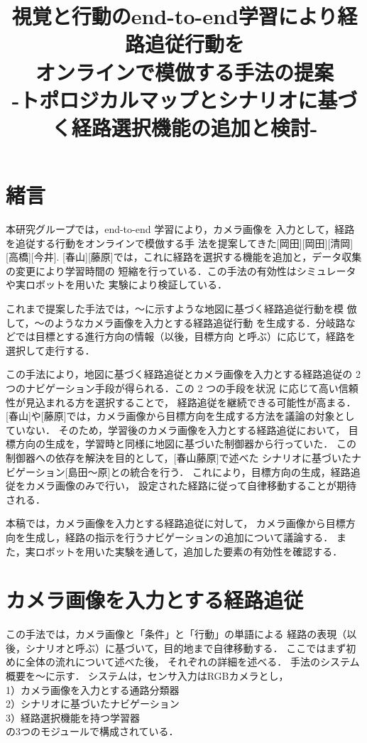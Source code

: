 \documentclass{sice-si}
\title{視覚と行動のend-to-end学習により経路追従行動を\\
オンラインで模倣する手法の提案\\
-トポロジカルマップとシナリオに基づく経路選択機能の追加と検討-\\} %
\begin{document}

\maketitle

\section{緒言}

本研究グループでは，end-to-end 学習により，カメラ画像を
入力として，経路を追従する行動をオンラインで模倣する手
法を提案してきた[岡田][岡田][清岡][高橋][今井].
[春山][藤原]では，これに経路を選択する機能を追加と，データ収集の変更により学習時間の
短縮を行っている．この手法の有効性はシミュレータや実ロボットを用いた
実験により検証している．

これまで提案した手法では，〜に示すような地図に基づく経路追従行動を模
倣して，〜のようなカメラ画像を入力とする経路追従行動
を生成する．分岐路などでは目標とする進行方向の情報（以後，目標方向
と呼ぶ）に応じて，経路を選択して走行する．\par

この手法により，地図に基づく経路追従とカメラ画像を入力とする経路追従の
2 つのナビゲーション手段が得られる．この 2 つの手段を状況
に応じて高い信頼性が見込まれる方を選択することで，
経路追従を継続できる可能性が高まる．
[春山]や[藤原]では，カメラ画像から目標方向を生成する方法を議論の対象としていない．
そのため，学習後のカメラ画像を入力とする経路追従において，
目標方向の生成を，学習時と同様に地図に基づいた制御器から行っていた．
この制御器への依存を解決を目的として，[春山藤原]で述べた
シナリオに基づいたナビゲーション[島田〜原]との統合を行う．
これにより，目標方向の生成，経路追従をカメラ画像のみで行い，
設定された経路に従って自律移動することが期待される．
\par
本稿では，カメラ画像を入力とする経路追従に対して，
カメラ画像から目標方向を生成し，経路の指示を行うナビゲーションの追加について議論する．
また，実ロボットを用いた実験を通して，追加した要素の有効性を確認する．


\section{カメラ画像を入力とする経路追従}
この手法では，カメラ画像と「条件」と「行動」の単語による
経路の表現（以後，シナリオと呼ぶ）に基づいて，目的地まで自律移動する．
ここではまず初めに全体の流れについて述べた後，
それぞれの詳細を述べる．
手法のシステム概要を〜に示す．
システムは，センサ入力はRGBカメラとし，\\
1）カメラ画像を入力とする通路分類器\\
2）シナリオに基づいたナビゲーション\\
3）経路選択機能を持つ学習器\\
の3つのモジュールで構成されている．
\end{document}
